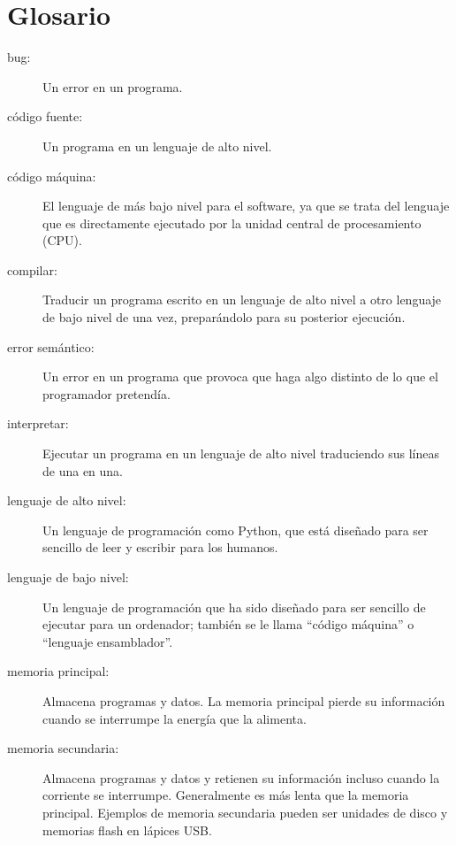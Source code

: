 \section{Glosario}

\begin{description}

\item[bug:] Un error en un programa.

\item[código fuente:] Un programa en un lenguaje de alto nivel.

\item[código máquina:] El lenguaje de más bajo nivel para el software, ya que se trata
del lenguaje que es directamente ejecutado por la unidad central de procesamiento
(CPU).

\item[compilar:] Traducir un programa escrito en un lenguaje de alto nivel
a otro lenguaje de bajo nivel de una vez, preparándolo para su posterior
ejecución.

\item[error semántico:] Un error en un programa que provoca que haga algo
distinto de lo que el programador pretendía.

\item[interpretar:]  Ejecutar un programa en un lenguaje de alto nivel
traduciendo sus líneas de una en una.

\item[lenguaje de alto nivel:]  Un lenguaje de programación como Python, que
está diseñado para ser sencillo de leer y escribir para los humanos.

\item[lenguaje de bajo nivel:]  Un lenguaje de programación que ha sido diseñado
para ser sencillo de ejecutar para un ordenador; también se le llama ``código máquina''
o ``lenguaje ensamblador''.

\item[memoria principal:] Almacena programas y datos. La memoria principal pierde
su información cuando se interrumpe la energía que la alimenta.

\item[memoria secundaria:] Almacena programas y datos y retienen su
información incluso cuando la corriente se interrumpe. Generalmente es más lenta
que la memoria principal. Ejemplos de memoria secundaria pueden ser unidades de
disco y memorias flash en lápices USB.


\end{description}
